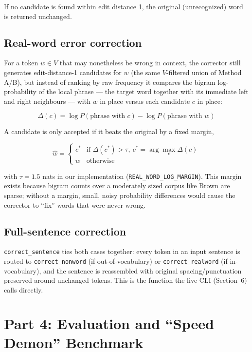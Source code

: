 \documentclass[11pt]{article}
\begin{document}
If no candidate is found within edit distance 1, the original (unrecognized) word is returned unchanged.

\subsection{Real-word error correction}

For a token $w \in V$ that may nonetheless be wrong in context, the corrector still generates edit-distance-1 candidates for $w$ (the same $V$-filtered union of Method A/B), but instead of ranking by raw frequency it compares the bigram log-probability of the local phrase --- the target word together with its immediate left and right neighbours --- with $w$ in place versus each candidate $c$ in place:

\[
\Delta(c) = \log P(\text{phrase with } c) - \log P(\text{phrase with } w)
\]

A candidate is only accepted if it beats the original by a fixed margin,

\[
\hat{w} =
\begin{cases}
c^{*} & \text{if } \Delta(c^{*}) > \tau, \ c^{*} = \arg\max_c \Delta(c) \\
w & \text{otherwise}
\end{cases}
\]

with $\tau = 1.5$ nats in our implementation (\texttt{REAL\_WORD\_LOG\_MARGIN}). This margin exists because bigram counts over a moderately sized corpus like Brown are sparse; without a margin, small, noisy probability differences would cause the corrector to ``fix'' words that were never wrong.

\subsection{Full-sentence correction}

\texttt{correct\_sentence} ties both cases together: every token in an input sentence is routed to \texttt{correct\_nonword} (if out-of-vocabulary) or \texttt{correct\_realword} (if in-vocabulary), and the sentence is reassembled with original spacing/punctuation preserved around unchanged tokens. This is the function the live CLI (Section~6) calls directly.

\section{Part 4: Evaluation and ``Speed Demon'' Benchmark}
\end{document}
